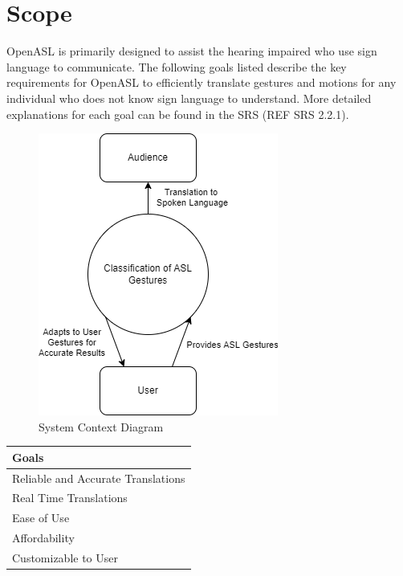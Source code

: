 \documentclass[12pt, titlepage]{article}
\begin{document}
\section{Scope}
OpenASL is primarily designed to assist the hearing impaired who use sign language to communicate. The following goals listed 
describe the key requirements for OpenASL to efficiently translate gestures and motions for any individual who does not know sign language 
to understand. More detailed explanations for each goal can be found in the SRS (REF SRS 2.2.1).

\begin{figure}[H] 
\centering
\includegraphics[width=\textwidth,height=0.88\textheight,keepaspectratio,scale=0.75]{SystemContextDiagram.jpg} 
\caption{System Context Diagram} 
\label{Fig.System_Context_Diagram} 
\end{figure}

\begin{center}
\begin{tabular} {m{18em}}
  \toprule		
  \textbf{Goals}\\
  \midrule 
  Reliable and Accurate Translations\\
  \hline
  Real Time Translations\\ 
  \hline
  Ease of Use\\
  \hline
  Affordability\\
  \hline
  Customizable to User\\
  \bottomrule
\end{tabular}\\
\end{center}
\end{document}

